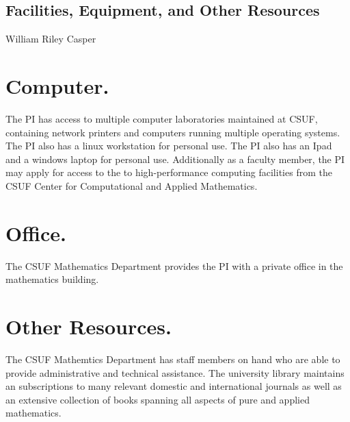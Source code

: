 \documentclass[11pt,letterpaper]{article}
\newcommand{\required}[1]{\section*{\hfil #1\hfil}}                    %
\theoremstyle{definition}
\begin{document}
\begin{center}
\required{Facilities, Equipment, and Other Resources}
William Riley Casper
\end{center}

\section{Computer.}
The PI has access to multiple computer laboratories maintained at CSUF, containing network printers and computers running multiple operating systems.
The PI also has a linux workstation for personal use.
The PI also has an Ipad and a windows laptop for personal use.
Additionally as a faculty member, the PI may apply for access to the to high-performance computing facilities from the CSUF Center for Computational and Applied Mathematics.

\section{Office.}
The CSUF Mathematics Department provides the PI with a private office in the mathematics building.

\section{Other Resources.}
The CSUF Mathemtics Department has staff members on hand who are able to provide
administrative and technical assistance.  The university library maintains an
subscriptions to many relevant domestic and international journals as well as
an extensive collection of books spanning all aspects of pure and applied
mathematics.

\newpage

\end{document}
